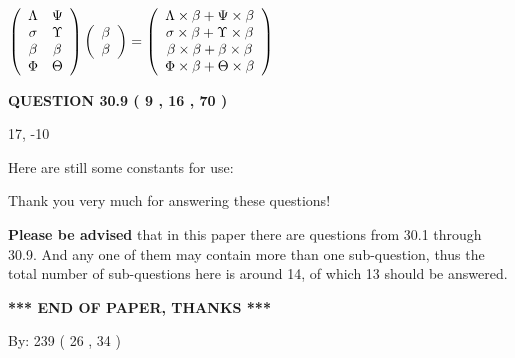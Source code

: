 \documentclass[12pt]{article}
\begin{document}
$  %
 \left( \begin{array}
 {
 c
 c
 }
 \Lambda & 
 \Psi \\ 
 \sigma & 
 \Upsilon \\ 
 \beta & 
 \beta \\ 
 \Phi & 
 \Theta
 \end{array} \right)
 \left( \begin{array}
 {
 c
 }
 \beta \\ 
 \beta
 \end{array} \right)
=
 \left( \begin{array}
 {
 c
 }
  \Lambda \times  \beta +  \Psi \times  \beta \\ 
  \sigma \times  \beta +  \Upsilon \times  \beta \\ 
  \beta \times  \beta +  \beta \times  \beta \\ 
  \Phi \times  \beta +  \Theta \times  \beta
 \end{array} \right)
$
 
 
 
  
\vspace{0.2in}
  
{\textbf{\Large{QUESTION
30.9 
 (           9 ,          16 ,          70 )
}}}
  
  


 
 
\noindent{}

17,  %
-10
 
 
 
   
   
 \vspace{0.2in}
Here are still some constants for use:
 
 
 
 
Thank you very much for answering these questions!
 
{\textbf{\large{Please be advised}}} that in this paper there are questions from
30.1 through
30.9.
And any one of them may contain more than one sub-question, thus the total number
of sub-questions here is around 14, of which
13 should be answered.
 
   
   
   
   
\vspace{1.0in} 
{\textbf{\large{ *** END OF PAPER, THANKS *** }}} 
   
   
\hspace{1.0in} By: 
         239 (          26 ,           34 )
   
\end{document}
